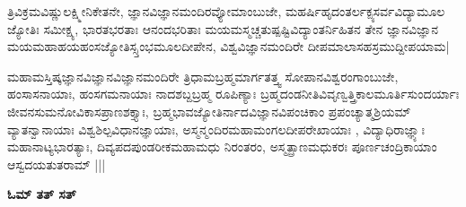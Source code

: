 ತ್ರಿವಿಕ್ರಮವಿಷ್ಣುಲಕ್ಷ್ಮೀನಿಕೇತನೇ, ಜ್ಞಾನವಿಜ್ಞಾನಮಂದಿರವ್ಯೋಮಾಂಬುಜೇ, ಮಹರ್ಷಿಹೃದಂತರ್ಲಕ್ಪ್ಯಸರ್ವವಿದ್ಯಾಮೂಲ ಜ್ಯೋತಿಃ  ಸಮೀಕ್ಷ್ಯ, ಭಾರತಭರತಾಃ ಆನಂದಭರಿತಾಃ ಮಯಮಸ್ಮಚ್ಚತುಷ್ಪಷ್ಟಿವಿದ್ಯಾಂತರ್ನಿಹಿತನ ತೇನ ಜ್ಞಾನವಿಜ್ಞಾನ ಮಯಮಹಾಹಯಹಂಸಜ್ಯೋತಿಸ್ಸ್ತಂಭಮೂಲದೀಪೇನ, ವಿಶ್ವವಿಜ್ಞಾನಮಂದಿರೇ ದೀಪಮಾಲಾಸಹಸ್ರಮುದ್ದೀಪಯಾಮ|

ಮಹಾಮಸ್ತಿಷ್ಕಜ್ಞಾನವಿಜ್ಞಾನವಿಜ್ಞಾನಮಂದಿರೇ ತ್ರಿಧಾಮಬ್ರಹ್ಮಮಾರ್ಗತತ್ತ್ವ  ಸೋಪಾನವಿಶ್ವರಂಗಾಂಬುಜೇ, ಹಂಸಾಸನಾಯಾಃ, ಹಂಸಗಮನಾಯಾಃ ನಾದಶಬ್ದಬ್ರಹ್ಮ ರೂಪಿಣ್ಯಾಃ ಬ್ರಹ್ಮದಂಡನೀತಿವಿವೃಣ್ವತ್ತ್ರಿಕಾಲಮೂರ್ತಿಸುಂದರ್ಯಾಃ ಜೀವನಸುಮನೋವಿಕಾಸಪ್ರಾಣಶಕ್ತ್ಯಾಃ, ಬ್ರಹ್ಮಭಾವಜ್ಯೋತಿರ್ನಾದವಿಜ್ಞಾನವಿಪಂಚಿಕಾಂ ಪ್ರಪಂಚ್ಯಾತ್ಮಶ್ರಿಯಮ್ ವ್ಯಾತನ್ವಾನಾಯಾಃ ವಿಶ್ವಶಿಲ್ಪವಿಧಾನಜ್ಞಾಯಾಃ, ಅಸ್ಮನ್ಮಂದಿರಮಹಾಮಂಗಲದೀಪರೇಖಾಯಾಃ , ವಿದ್ಯಾಧಿರಾಜ್ಞ್ಯಾಃ ಮಹಾನಾಟ್ಯಭಾರತ್ಯಾಃ, ದಿವ್ಯಪದಪುಂಡರೀಕಮಹಾಮಧು ನಿರಂತರಂ, ಅಸ್ಮತ್ಪ್ರಾಣಮಧುಕರಃ ಪೂರ್ಣಚಂದ್ರಿಕಾಯಾಂ ಆಸ್ವದಯತುತರಾಮ್ |||

\vskip 30pt

\centerline{\bf ಓಮ್ ತತ್ ಸತ್}


